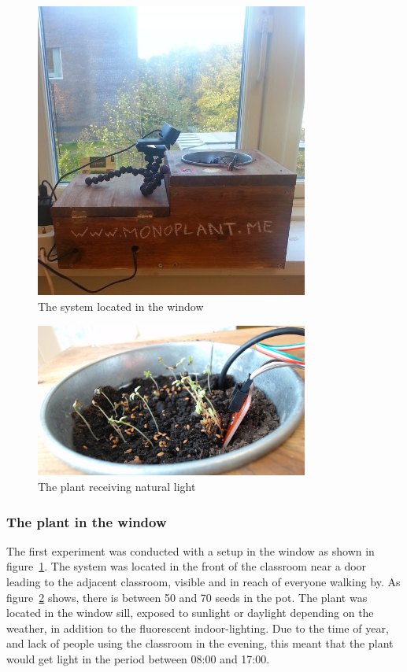 \begin{figure}
\centering
\includegraphics[width=0.8\textwidth]{img/empiricalsetting/window.jpg}
\caption{The system located in the window}
\label{fig:windowplant}
\end{figure}

\begin{figure}
\centering
\includegraphics[width=0.8\textwidth]{img/empiricalsetting/windowsystem.jpg}
\caption{The plant receiving natural light}
\label{fig:windowsystemplant}
\end{figure}

\subsubsection*{The plant in the window}
The first experiment was conducted with a setup in the window as shown in figure~\ref{fig:windowplant}. The system was located in the front of the classroom near a door leading to the adjacent classroom, visible and in reach of everyone walking by. As figure~\ref{fig:windowsystemplant} shows, there is between 50 and 70 seeds in the pot. The plant was located in the window sill, exposed to sunlight or daylight depending on the weather, in addition to the fluorescent indoor-lighting. Due to the time of year, and lack of people using the classroom in the evening, this meant that the plant would get light in the period between 08:00 and 17:00.

